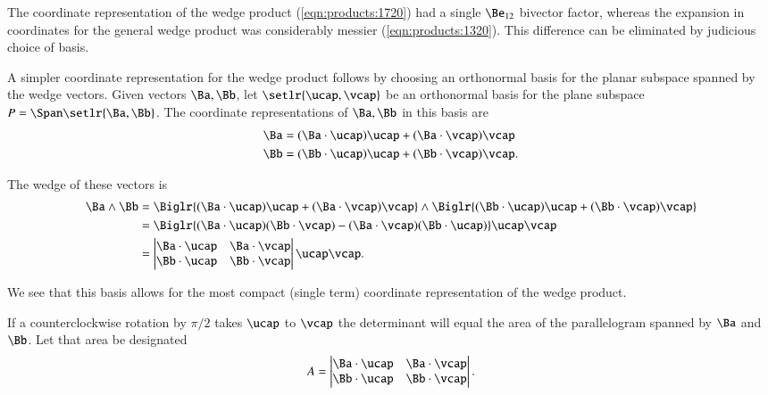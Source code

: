 %
%
The coordinate representation of the  wedge product (\cref{eqn:products:1720}) had a single \( \Be_{12} \) bivector factor, whereas the expansion in coordinates for the general  wedge product was considerably messier (\cref{eqn:products:1320}).
This difference can be eliminated by judicious choice of basis.

A simpler coordinate representation for the  wedge product follows by choosing an
orthonormal basis
for the planar subspace spanned by the wedge vectors.
Given vectors \( \Ba, \Bb \), let \( \setlr{\ucap, \vcap} \) be an orthonormal basis for the plane subspace
\( P = \Span\setlr{ \Ba, \Bb } \).
The coordinate representations of \( \Ba, \Bb \) in this basis are
\begin{equation}\label{eqn:wedgeProductArea:1900}
\begin{aligned}
\Ba &= (\Ba \cdot \ucap) \ucap + (\Ba \cdot \vcap) \vcap \\
\Bb &= (\Bb \cdot \ucap) \ucap + (\Bb \cdot \vcap) \vcap.
\end{aligned}
\end{equation}

The wedge of these vectors is
\begin{equation}\label{eqn:wedgeProductArea:1860}
\begin{aligned}
\Ba \wedge \Bb
&=
   \Biglr{
   (\Ba \cdot \ucap) \ucap + (\Ba \cdot \vcap) \vcap
   }
\wedge
   \Biglr{
   (\Bb \cdot \ucap) \ucap + (\Bb \cdot \vcap) \vcap
   } \\
   &=
\Biglr{
      (\Ba \cdot \ucap)
   (\Bb \cdot \vcap)
   -
   (\Ba \cdot \vcap) (\Bb \cdot \ucap)
}
\ucap \vcap \\
&=
\begin{vmatrix}
   \Ba \cdot \ucap & \Ba \cdot \vcap \\
   \Bb \cdot \ucap & \Bb \cdot \vcap
\end{vmatrix}
\ucap \vcap.
\end{aligned}
\end{equation}

We see that this basis allows for the most compact (single term) coordinate representation of the wedge product.

If a counterclockwise rotation by \( \pi/2 \) takes \( \ucap \) to \( \vcap \) the determinant will equal the area of the parallelogram spanned by \( \Ba \) and \( \Bb \).
Let that area be designated
\begin{equation}\label{eqn:wedgeProductArea:1920}
A =
\begin{vmatrix}
   \Ba \cdot \ucap & \Ba \cdot \vcap \\
   \Bb \cdot \ucap & \Bb \cdot \vcap
\end{vmatrix}.
\end{equation}

